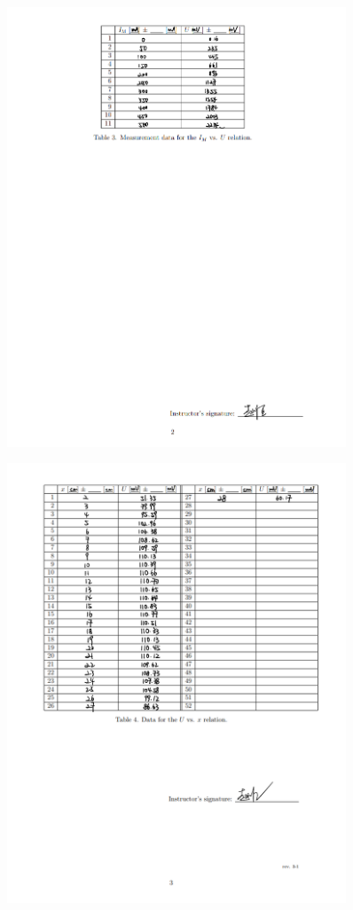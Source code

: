 \documentclass[12pt, a4paper, oneside]{article}
\begin{document}
\begin{figure}[htbp]
	\centering
	\includegraphics[width=0.9\textwidth]{D2.png}
	\label{fig5}
\end{figure}

\begin{figure}[htbp]
	\centering
	\includegraphics[width=0.9\textwidth]{D3.png}
	\label{fig5}
\end{figure}

\end{document}
